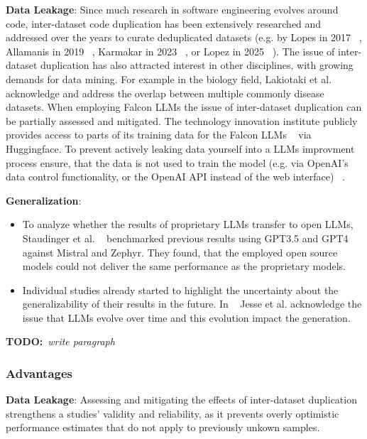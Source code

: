 \documentclass[11pt]{article}
\newcommand{\todo}[1]{{\textbf{TODO:}\ \textit{#1}}} %
\begin{document}
\textbf{Data Leakage}:
Since much research in software engineering evolves around code, inter-dataset code duplication has been extensively researched and addressed over the years to curate deduplicated datasets (e.g. by Lopes in 2017 ~\cite{10.1145/3133908}, Allamanis in 2019 ~\cite{10.1145/3359591.3359735}, Karmakar in 2023 ~\cite{10.1007/s10664-022-10275-7}, or Lopez in 2025 ~\cite{inter-dataset-lopez2025}).
The issue of inter-dataset duplication has also attracted interest in other disciplines, with growing demands for data mining. For example in the biology field, Lakiotaki et al. ~\cite{10.1093/database/bay011} acknowledge and address the overlap between multiple commonly disease datasets. 
When employing Falcon LLMs the issue of inter-dataset duplication can be partially assessed and mitigated. The technology innovation institute publicly provides access to parts of its training data for the Falcon LLMs ~\cite{technology_innovation_institute_2023} via Huggingface.
To prevent actively leaking data yourself into a LLMs improvment process ensure, that the data is not used to train the model (e.g. via OpenAI's data control functionality, or the OpenAI API instead of the web interface) ~\cite{balloccu-etal-2024-leak}.

\textbf{Generalization}:
\begin{itemize}
  \item To analyze whether the results of proprietary LLMs transfer to open LLMs, Staudinger et al. ~\cite{10.1145/3673791.3698432} benchmarked previous results using GPT3.5 and GPT4 against Mistral and Zephyr. They found, that the employed open source models could not deliver the same performance as the proprietary models.
  \item Individual studies already started to highlight the uncertainty about the generalizability of their results in the future. In ~\cite{10174227} Jesse et al. acknowledge the issue that LLMs evolve over time and this evolution impact the generation.
\end{itemize}


\todo{write paragraph}

\subsubsection{Advantages}
\textbf{Data Leakage}:
Assessing and mitigating the effects of inter-dataset duplication strengthens a studies' validity and reliability, as it prevents overly optimistic performance estimates that do not apply to previously unkown samples.
\end{document}
